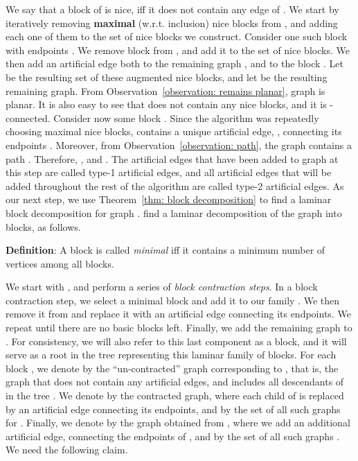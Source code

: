 \documentclass[twoside,leqno,twocolumn]{article}
\newenvironment{Definition}{{\bf Definition}: }{}
\begin{document}
We say that a block  of  is nice, iff it does not contain any edge of . We start by iteratively removing {\bf maximal} (w.r.t. inclusion) nice blocks from , and adding each one of them to the set  of nice blocks we construct. 
Consider one such block  with endpoints . We remove block  from , and add it to the set  of nice blocks. We then add an artificial edge  both to the remaining graph , and to the block . Let  be the resulting set of these augmented nice blocks, and let  be the resulting remaining graph. From Observation~\ref{observation: remains planar}, graph  is planar. It is also easy to see that  does not contain any nice blocks, and it is -connected.
Consider now some block . Since the algorithm was repeatedly choosing maximal nice blocks,  contains a unique artificial edge, , connecting its endpoints . Moreover, from Observation~\ref{observation: path}, the graph  contains a path . Therefore, , and . The artificial edges that have been added to graph  at this step are called type-1 artificial edges, and all artificial edges that will be added throughout the rest of the algorithm are called type-2 artificial edges.
As our next step, we use Theorem~\ref{thm: block decomposition} to find a laminar block decomposition  for graph .
\iffalse
find a laminar decomposition  of the graph  into blocks, as follows. 

\begin{Definition}
A block is called \emph{minimal} iff it contains a minimum number of vertices among all blocks. 
\end{Definition}

We start with , and perform a series of \emph{block contraction steps}.
In a block contraction step, we select a minimal 
block  and add it to our family . We then remove it from  and replace it with an artificial edge connecting its endpoints. We repeat until there are no basic blocks left. Finally, we add the remaining graph  to . For consistency, we will also refer to this last component as a block, and it will serve as a root in the tree  representing this laminar family  of blocks.
For each block , we denote by  the ``un-contracted'' graph corresponding to , that is, the graph that does not contain any artificial edges, and includes all descendants of  in the tree . We denote by  the contracted graph, where each child of  is replaced by an artificial edge connecting its endpoints, and by  the set of all such graphs  for . Finally, we denote by  the graph obtained from , where we add an additional artificial edge, connecting the endpoints of , and by  the set of all such graphs . We need the following claim.
\end{document}
